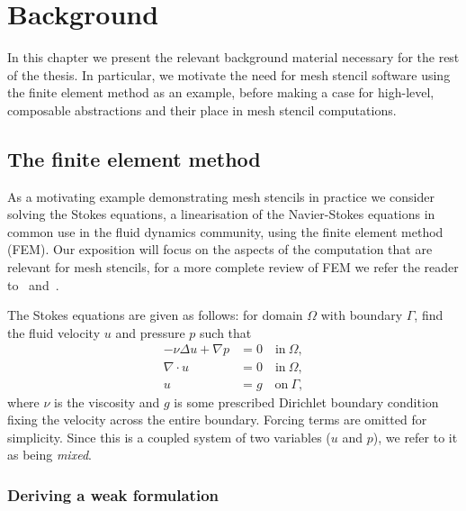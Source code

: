 \documentclass[thesis]{subfiles}
\begin{document}

\chapter{Background}
\label{chapter:background}

In this chapter we present the relevant background material necessary for the rest of the thesis.
In particular, we motivate the need for mesh stencil software using the finite element method as an example, before making a case for high-level, composable abstractions and their place in mesh stencil computations.

\section{The finite element method}
\label{sec:stokes_equations}

As a motivating example demonstrating mesh stencils in practice we consider solving the Stokes equations, a linearisation of the Navier-Stokes equations in common use in the fluid dynamics community, using the finite element method (FEM).
Our exposition will focus on the aspects of the computation that are relevant for mesh stencils, for a more complete review of FEM we refer the reader to~\cite{brennerMathematicalTheoryFinite2008} and~\cite{larsonFiniteElementMethod2013}.

The Stokes equations are given as follows: for domain $\Omega$ with boundary $\Gamma$, find the fluid velocity $u$ and pressure $p$ such that
\begin{equation} \label{eq:strong_stokes}
  \begin{aligned}
    - \nu \Delta u + \nabla p &= 0 \quad \textrm{in} \ \Omega, \\
    \nabla \cdot u &= 0 \quad \textrm{in} \ \Omega, \\
    u &= g \quad \textrm{on} \ \Gamma,
  \end{aligned}
\end{equation}
where $\nu$ is the viscosity and $g$ is some prescribed Dirichlet boundary condition fixing the velocity across the entire boundary.
Forcing terms are omitted for simplicity.
Since this is a coupled system of two variables ($u$ and $p$), we refer to it as being \emph{mixed}.

\subsection{Deriving a weak formulation}
\end{document}
